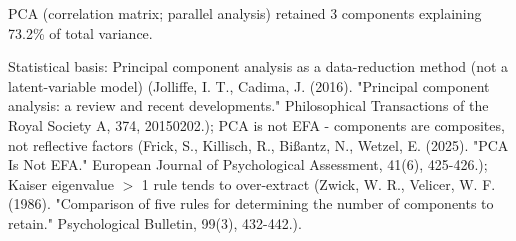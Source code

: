 \documentclass{article}
\begin{document}
PCA (correlation matrix; parallel analysis) retained 3 components explaining 73.2\% of total variance.

Statistical basis: Principal component analysis as a data-reduction method (not a latent-variable model) (Jolliffe, I. T., Cadima, J. (2016). "Principal component analysis: a review and recent developments." Philosophical Transactions of the Royal Society A, 374, 20150202.); PCA is not EFA - components are composites, not reflective factors (Frick, S., Killisch, R., Bißantz, N., Wetzel, E. (2025). "PCA Is Not EFA." European Journal of Psychological Assessment, 41(6), 425-426.); Kaiser eigenvalue $>$ 1 rule tends to over-extract (Zwick, W. R., Velicer, W. F. (1986). "Comparison of five rules for determining the number of components to retain." Psychological Bulletin, 99(3), 432-442.).
\end{document}
